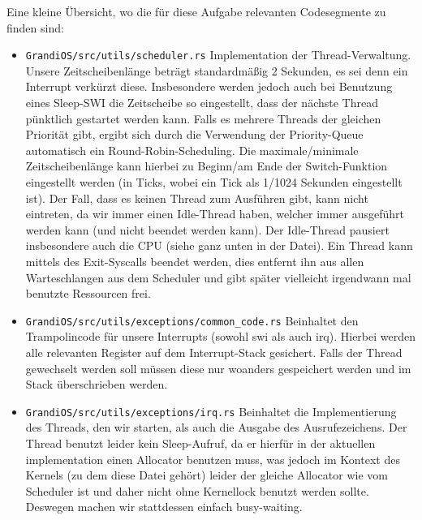 \begin{description}
Eine kleine Übersicht, wo die für diese Aufgabe relevanten Codesegmente zu finden sind:
\begin{itemize}
	\item \texttt{GrandiOS/src/utils/scheduler.rs} Implementation der Thread-Verwaltung. Unsere Zeitscheibenlänge beträgt standardmäßig 2 Sekunden, es sei denn ein Interrupt verkürzt diese. Insbesondere werden jedoch auch bei Benutzung eines Sleep-SWI die Zeitscheibe so eingestellt, dass der nächste Thread pünktlich gestartet werden kann. Falls es mehrere Threads der gleichen Priorität gibt, ergibt sich durch die Verwendung der Priority-Queue automatisch ein Round-Robin-Scheduling. Die maximale/minimale Zeitscheibenlänge kann hierbei zu Beginn/am Ende der Switch-Funktion eingestellt werden (in Ticks, wobei ein Tick als 1/1024 Sekunden eingestellt ist). Der Fall, dass es keinen Thread zum Ausführen gibt, kann nicht eintreten, da wir immer einen Idle-Thread haben, welcher immer ausgeführt werden kann (und nicht beendet werden kann). Der Idle-Thread pausiert insbesondere auch die CPU (siehe ganz unten in der Datei). Ein Thread kann mittels des Exit-Syscalls beendet werden, dies entfernt ihn aus allen Warteschlangen aus dem Scheduler und gibt später vielleicht irgendwann mal benutzte Ressourcen frei.
	\item \texttt{GrandiOS/src/utils/exceptions/common\_code.rs} Beinhaltet den Trampolincode für unsere Interrupts (sowohl swi als auch irq). Hierbei werden alle relevanten Register auf dem Interrupt-Stack gesichert. Falls der Thread gewechselt werden soll müssen diese nur woanders gespeichert werden und im Stack überschrieben werden.
	\item \texttt{GrandiOS/src/utils/exceptions/irq.rs} Beinhaltet die Implementierung des Threads, den wir starten, als auch die Ausgabe des Ausrufezeichens. Der Thread benutzt leider kein Sleep-Aufruf, da er hierfür in der aktuellen implementation einen Allocator benutzen muss, was jedoch im Kontext des Kernels (zu dem diese Datei gehört) leider der gleiche Allocator wie vom Scheduler ist und daher nicht ohne Kernellock benutzt werden sollte. Deswegen machen wir stattdessen einfach busy-waiting.
\end{itemize}

\end{description}

